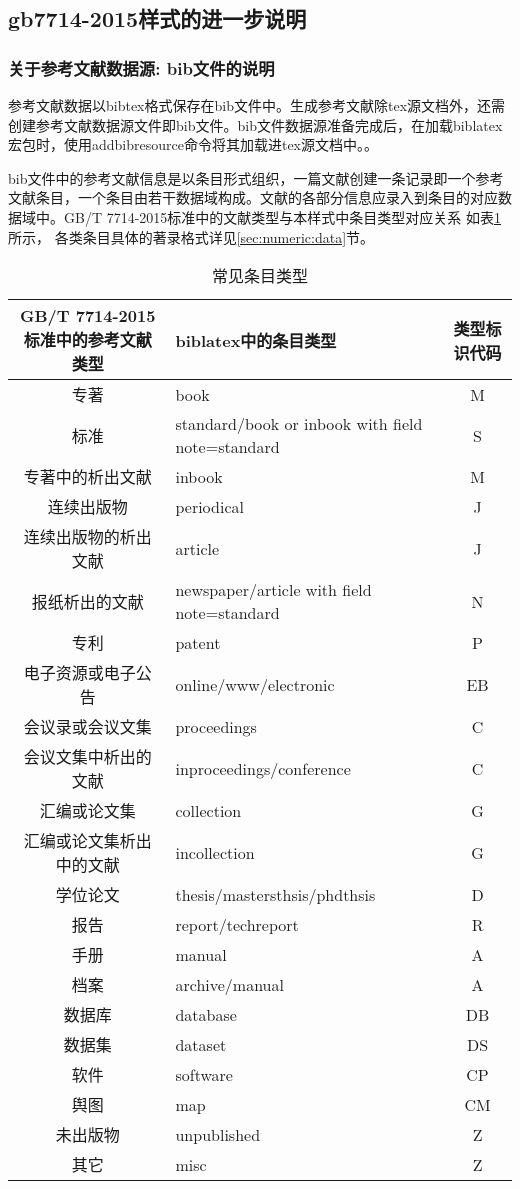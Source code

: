 \subsection{gb7714-2015样式的进一步说明}

\subsubsection{关于参考文献数据源: bib文件的说明}\label{sec:bib:bibtex}

参考文献数据以bibtex格式保存在bib文件中。生成参考文献除tex源文档外，还需创建参考文献数据源文件即bib文件。bib文件数据源准备完成后，在加载biblatex宏包时，使用addbibresource命令将其加载进tex源文档中。。

bib文件中的参考文献信息是以条目形式组织，一篇文献创建一条记录即一个参考文献条目，一个条目由若干数据域构成。文献的各部分信息应录入到条目的对应数据域中。GB/T 7714-2015标准中的文献类型与本样式中条目类型对应关系
如表\ref{tab:entrytypes}所示，
各类条目具体的著录格式详见\ref{sec:numeric:data}节。
\begin{table}[!htb]
\centering
\caption{常见条目类型}\label{tab:entrytypes}
\small
\begin{tabular}{clc}
\hline
  GB/T 7714-2015标准中的参考文献类型 &  biblatex中的条目类型 &  类型标识代码\\ \hline
  专著& book & M\\
  标准& standard/book or inbook with field note=standard& S\\
  专著中的析出文献& inbook & M\\
  连续出版物& periodical& J\\
  连续出版物的析出文献& article& J\\
  报纸析出的文献& newspaper/article with field note=standard& N\\
  专利& patent& P\\
  电子资源或电子公告& online/www/electronic& EB\\
  会议录或会议文集& proceedings& C\\
  会议文集中析出的文献& inproceedings/conference& C\\
  汇编或论文集& collection& G\\
  汇编或论文集析出中的文献& incollection& G\\
  学位论文& thesis/mastersthsis/phdthsis& D\\
  报告& report/techreport& R\\
  手册& manual& A\\
  档案& archive/manual& A\\
  数据库& database& DB\\
  数据集& dataset& DS\\
  软件& software& CP\\
  舆图& map& CM\\
  未出版物& unpublished& Z\\
  其它& misc& Z\\
  \hline
  \end{tabular}
\end{table}


